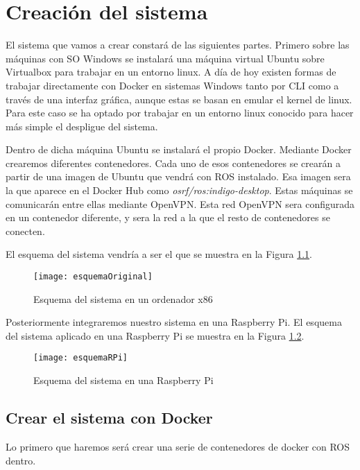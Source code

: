 \chapter{Creación del sistema}

El sistema que vamos a crear constará de las siguientes partes. Primero sobre las máquinas con SO Windows se instalará una máquina virtual Ubuntu sobre Virtualbox para trabajar en un entorno linux. A día de hoy existen formas de trabajar directamente con Docker en sistemas Windows tanto por CLI como a través de una interfaz gráfica, aunque estas se basan en emular el kernel de linux. Para este caso se ha optado por trabajar en un entorno linux conocido para hacer más simple el despligue del sistema.

Dentro de dicha máquina Ubuntu se instalará el propio Docker. Mediante Docker crearemos diferentes contenedores. Cada uno de esos contenedores se crearán a partir de una imagen de Ubuntu que vendrá con ROS instalado. Esa imagen sera la que aparece en el Docker Hub como \emph{osrf/ros:indigo-desktop}. Estas máquinas se comunicarán entre ellas mediante OpenVPN. Esta red OpenVPN sera configurada en un contenedor diferente, y sera la red a la que el resto de contenedores se conecten.

El esquema del sistema vendría a ser el que se muestra en la Figura \ref{fig:esquemaOriginal}.
\begin{figure}[H] %
	\centering
	\texttt{[image: esquemaOriginal]}
	\caption{Esquema del sistema en un ordenador x86}
	\label{fig:esquemaOriginal}
\end{figure}

Posteriormente integraremos nuestro sistema en una Raspberry Pi. El esquema del sistema aplicado en una Raspberry Pi se muestra en la Figura \ref{fig:esquemaRPi}.
\begin{figure}[H]
	\centering
	\texttt{[image: esquemaRPi]}
	\caption{Esquema del sistema en una Raspberry Pi}
	\label{fig:esquemaRPi}
\end{figure}

	\section{Crear el sistema con Docker}
	Lo primero que haremos será crear una serie de contenedores de docker con ROS dentro.
	
